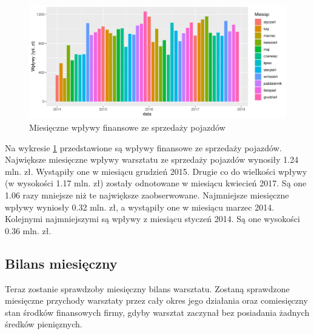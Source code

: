 \documentclass{article}\usepackage[]{graphicx}\usepackage[]{xcolor}
\makeatletter
\def\maxwidth{ %
  \ifdim\Gin@nat@width>\linewidth
    \linewidth
  \else
    \Gin@nat@width
  \fi
}
\newenvironment{knitrout}{}{} %
\makeatother
\begin{document}
\begin{knitrout}
\color{fgcolor}\begin{figure}[H]

{\centering \includegraphics[width=\maxwidth]{figure/fig_samochody_wplywy-1} 

}

\caption[Miesięczne wpływy finansowe ze sprzedaży pojazdów]{Miesięczne wpływy finansowe ze sprzedaży pojazdów}\label{fig:fig_samochody_wplywy}
\end{figure}

\end{knitrout}

Na wykresie \ref{fig:fig_samochody_wplywy} przedstawione są wpływy finansowe ze sprzedaży pojazdów. 
Największe miesięczne wpływy warsztatu ze sprzedaży pojazdów wynosiły 1.24 mln. zł. Wystąpiły one w miesiącu grudzień 2015. 
Drugie co do wielkości wpływy (w wysokości 1.17 mln. zł) zostały odnotowane w miesiącu kwiecień 2017. Są one 1.06 razy mniejsze niż te największe zaobserwowane.
Najmniejsze miesięczne wpływy wyniosły 0.32 mln. zł, a wystąpiły one w miesiącu marzec 2014.
Kolejnymi najmniejszymi są wpływy z miesiącu styczeń 2014. Są one wysokości 0.36 mln. zł.


\subsection{Bilans miesięczny}

Teraz zostanie sprawdzoby miesięczny bilans warsztatu. Zostaną sprawdzone miesięczne przychody warsztaty przez cały okres jego działania oraz comiesięczny stan środków finansowych firmy, gdyby warsztat zaczynał bez posiadania żadnych średków pienięznych.
\end{document}
